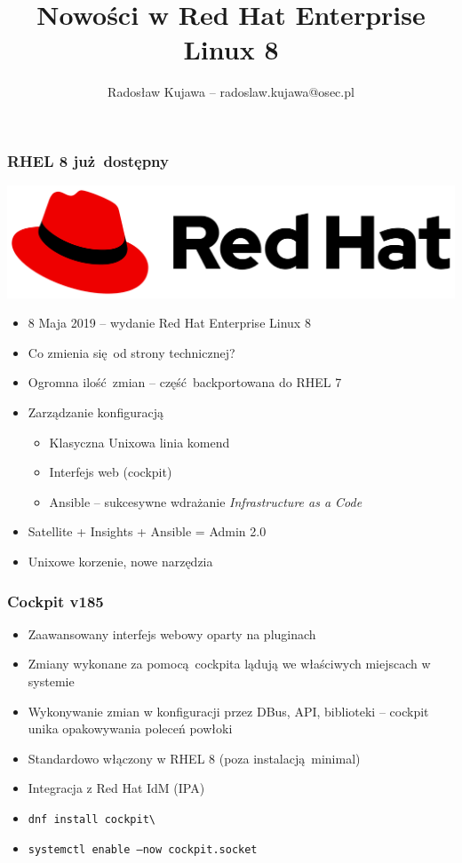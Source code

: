 \documentclass[dvipsnames,table]{beamer}
\title{Nowości w Red Hat Enterprise Linux 8}
\author{Radosław Kujawa -- radoslaw.kujawa@osec.pl}
\institute{OSEC}
\begin{document}
\begin{frame}
	\titlepage
\end{frame}

\begin{frame}
\frametitle{RHEL 8 już dostępny}
\begin{center}
\includegraphics[scale=0.1]{img-rhlogo.png}
\end{center}
\begin{itemize}
	\item 8 Maja 2019 -- wydanie Red Hat Enterprise Linux 8
	\item Co zmienia się od strony technicznej?
	\item Ogromna ilość zmian -- część backportowana do RHEL 7
	\item Zarządzanie konfiguracją
	\begin{itemize}
		\item Klasyczna Unixowa linia komend
		\item Interfejs web (cockpit)
		\item Ansible -- sukcesywne wdrażanie {\em Infrastructure as a Code}
	\end{itemize}
	\item Satellite + Insights + Ansible = Admin 2.0
	\item Unixowe korzenie, nowe narzędzia
\end{itemize}
\begin{center}
\end{center}
\end{frame}

\begin{frame}
\frametitle{Cockpit v185}
\begin{itemize}
	\item Zaawansowany interfejs webowy oparty na pluginach
	\item Zmiany wykonane za pomocą cockpita lądują we właściwych miejscach w systemie
	\item Wykonywanie zmian w konfiguracji przez DBus, API, biblioteki -- cockpit unika opakowywania poleceń powłoki
	\item Standardowo włączony w RHEL 8 (poza instalacją minimal)
	\item Integracja z Red Hat IdM (IPA)
	\item {\tt dnf install cockpit\textbackslash* }
	\item {\tt systemctl enable --now cockpit.socket}
\end{itemize}
\begin{center}
\end{center}
\end{frame}
\end{document}
